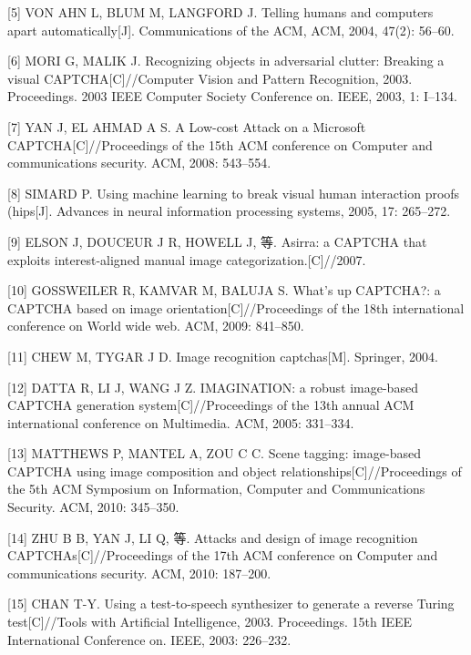 \documentclass[bachelor,zhspacing]{cqu}  %
\begin{document}
\hypertarget{ref-von2004telling}{}
{[}5{]} VON AHN L, BLUM M, LANGFORD J. Telling humans and computers
apart automatically{[}J{]}. Communications of the ACM, ACM, 2004, 47(2):
56--60.

\hypertarget{ref-mori2003recognizing}{}
{[}6{]} MORI G, MALIK J. Recognizing objects in adversarial clutter:
Breaking a visual CAPTCHA{[}C{]}//Computer Vision and Pattern
Recognition, 2003. Proceedings. 2003 IEEE Computer Society Conference
on. IEEE, 2003, 1: I--134.

\hypertarget{ref-yan2008low}{}
{[}7{]} YAN J, EL AHMAD A S. A Low-cost Attack on a Microsoft
CAPTCHA{[}C{]}//Proceedings of the 15th ACM conference on Computer and
communications security. ACM, 2008: 543--554.

\hypertarget{ref-simard2005using}{}
{[}8{]} SIMARD P. Using machine learning to break visual human
interaction proofs (hips{[}J{]}. Advances in neural information
processing systems, 2005, 17: 265--272.

\hypertarget{ref-elson2007asirra}{}
{[}9{]} ELSON J, DOUCEUR J R, HOWELL J, 等. Asirra: a CAPTCHA that
exploits interest-aligned manual image categorization.{[}C{]}//2007.

\hypertarget{ref-gossweiler2009s}{}
{[}10{]} GOSSWEILER R, KAMVAR M, BALUJA S. What's up CAPTCHA?: a CAPTCHA
based on image orientation{[}C{]}//Proceedings of the 18th international
conference on World wide web. ACM, 2009: 841--850.

\hypertarget{ref-chew2004image}{}
{[}11{]} CHEW M, TYGAR J D. Image recognition captchas{[}M{]}. Springer,
2004.

\hypertarget{ref-datta2005imagination}{}
{[}12{]} DATTA R, LI J, WANG J Z. IMAGINATION: a robust image-based
CAPTCHA generation system{[}C{]}//Proceedings of the 13th annual ACM
international conference on Multimedia. ACM, 2005: 331--334.

\hypertarget{ref-matthews2010scene}{}
{[}13{]} MATTHEWS P, MANTEL A, ZOU C C. Scene tagging: image-based
CAPTCHA using image composition and object
relationships{[}C{]}//Proceedings of the 5th ACM Symposium on
Information, Computer and Communications Security. ACM, 2010: 345--350.

\hypertarget{ref-zhu2010attacks}{}
{[}14{]} ZHU B B, YAN J, LI Q, 等. Attacks and design of image
recognition CAPTCHAs{[}C{]}//Proceedings of the 17th ACM conference on
Computer and communications security. ACM, 2010: 187--200.

\hypertarget{ref-chan2003using}{}
{[}15{]} CHAN T-Y. Using a test-to-speech synthesizer to generate a
reverse Turing test{[}C{]}//Tools with Artificial Intelligence, 2003.
Proceedings. 15th IEEE International Conference on. IEEE, 2003:
226--232.
\end{document}
